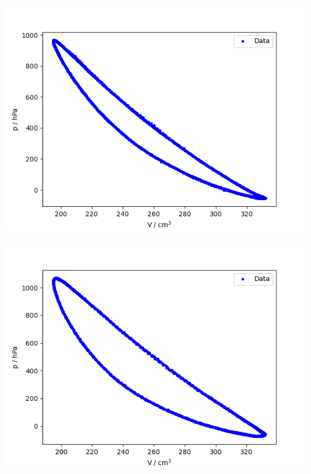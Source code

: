 \documentclass[11pt]{scrartcl}
\begin{document}
\begin{minipage}{\textwidth}
\begin{minipage}[t]{0.49\textwidth}
    \centering
    \includegraphics[width=\textwidth]{Unbelastet/fit_of_V_p.png}
    \label{fig:pVunbelastet}
\end{minipage}
\begin{minipage}[t]{0.49\textwidth}
    \centering
    \includegraphics[width=\textwidth]{Belastet/fit_of_V_p.png}
    \label{fig:pVbelastet}
\end{minipage}
    \vspace{1em}
\end{minipage}
\end{document}
